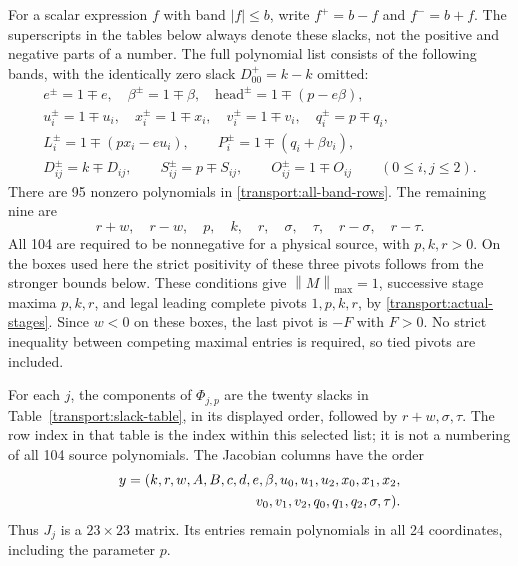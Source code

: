 \documentclass[11pt,reqno]{amsart}
\theoremstyle{definition}
\theoremstyle{remark}
\newcommand{\mx}[1]{\left\|#1\right\|_{\max}}
\begin{document}
For a scalar expression \(f\) with band \(|f|\le b\), write
\(f^+=b-f\) and \(f^-=b+f\).  The superscripts in the tables below
always denote these slacks, not the positive and negative parts of a
number.  The full polynomial list consists of the following bands,
with the identically zero slack \(D_{00}^+=k-k\) omitted:
\begin{equation}\label{transport:all-band-rows}
\begin{gathered}
e^\pm=1\mp e,\quad \beta^\pm=1\mp\beta,\quad
\mathrm{head}^\pm=1\mp(p-e\beta),\\
u_i^\pm=1\mp u_i,\quad x_i^\pm=1\mp x_i,\quad
v_i^\pm=1\mp v_i,\quad q_i^\pm=p\mp q_i,\\
L_i^\pm=1\mp(px_i-eu_i),\qquad
P_i^\pm=1\mp(q_i+\beta v_i),\\
D_{ij}^\pm=k\mp D_{ij},\qquad
S_{ij}^\pm=p\mp S_{ij},\qquad
O_{ij}^\pm=1\mp O_{ij}\qquad(0\le i,j\le2).
\end{gathered}
\end{equation}
There are 95 nonzero polynomials in
\eqref{transport:all-band-rows}.  The remaining nine are
\begin{equation}\label{transport:extra-rows}
r+w,\quad r-w,\quad p,\quad k,\quad r,\quad
\sigma,\quad\tau,\quad r-\sigma,\quad r-\tau.
\end{equation}
All 104 are required to be nonnegative for a physical source, with
\(p,k,r>0\).  On the boxes used here the strict positivity of these
three pivots follows from the stronger bounds below.  These conditions
give \(\mx{M}=1\), successive stage maxima \(p,k,r\), and legal
leading complete pivots \(1,p,k,r\), by
\eqref{transport:actual-stages}.  Since \(w<0\) on these boxes, the
last pivot is \(-F\) with \(F>0\).  No strict inequality between
competing maximal entries is required, so tied pivots are included.

For each \(j\), the components of \(\Phi_{j,p}\) are the twenty
slacks in Table~\ref{transport:slack-table}, in its displayed order,
followed by \(r+w,\sigma,\tau\).  The row index in that table is the
index within this selected list; it is not a numbering of all 104
source polynomials.  The Jacobian columns have the order
\begin{equation}\label{transport:jacobian-column-order}
\begin{split}
y={}&(k,r,w,A,B,c,d,e,\beta,u_0,u_1,u_2,x_0,x_1,x_2,\\
&\hspace{28mm}v_0,v_1,v_2,q_0,q_1,q_2,\sigma,\tau).
\end{split}
\end{equation}
Thus \(J_j\) is a \(23\times23\) matrix.  Its entries remain
polynomials in all 24 coordinates, including the parameter \(p\).
\end{document}

